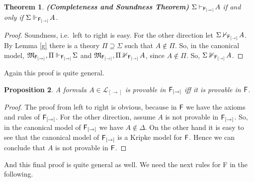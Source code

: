 \documentclass[12pt]{article}
\newtheorem{thm}{Theorem}[section]
\newtheorem{prop}[thm]{Proposition}
\begin{document}
\begin{thm}\label{FF}
\em\textbf{(Completeness and Soundness Theorem)} $ \Sigma\vdash_{{\sf F_{[\rightarrow ]}} }\!A $ if and only if $ \Sigma\Vdash_{{\sf F_{[\rightarrow ]}}}\!A $.
\end{thm}
\begin{proof} Soundness, i.e.\ left to right is easy. For the other direction let $ \Sigma\nvdash_{{\sf F_{[\rightarrow ]}}}\!A $. By Lemma \ref{g} there is a theory $ \Pi\supseteq\Sigma $ such that $ A \notin \Pi $. So, in the canonical model, $  \mathfrak{M}_{{\sf F_{[\rightarrow]}}}, \Pi\Vdash_{{\sf F_{[\rightarrow ]}} }\!\Sigma $ and $  \mathfrak{M}_{{\sf F_{[\rightarrow]}}},  \Pi\nVdash_{{\sf F_{[\rightarrow ]}} }\!A $, since $ A \notin \Pi $. So, $ \Sigma\nVdash_{{\sf F_{[\rightarrow ]}} }\!A$.
\end{proof}

Again this proof is quite general.



\begin{prop}\label{F12}
A formula $ A \in \mathcal{L}_{[\rightarrow]} $ is provable in $ {\sf F_{[\rightarrow]}}$ iff it is provable in ${\sf F}  $.
\end{prop}
\begin{proof}
The proof from left to right is obvious, because in ${\sf  F}  $ we have the axioms and rules of ${\sf F_{[\rightarrow]}}$. For the other direction, assume $ A $ is not provable in ${\sf F_{[\rightarrow]}}$. So, in the canonical model of $ {\sf F_{[\rightarrow]}}$ we have $ A\notin \Delta $. On the other hand it is easy to see that the canonical model of $ {\sf F_{[\rightarrow]}}$  is a Kripke model for ${\sf F}  $. Hence we can conclude that $ A $ is not provable in ${\sf F}  $.
\end{proof}

And this final proof is quite general as well. We need the next rules for {\sf F} in the following.
\end{document}
